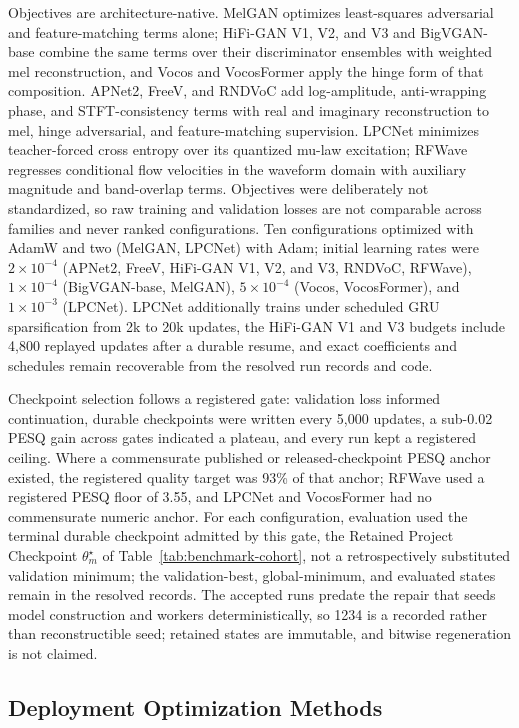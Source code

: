 Objectives are architecture-native.  MelGAN optimizes least-squares
adversarial and feature-matching terms alone; HiFi-GAN V1, V2, and V3 and
BigVGAN-base combine the same terms over their discriminator ensembles
with weighted mel reconstruction, and Vocos and VocosFormer apply the
hinge form of that composition.  APNet2, FreeV, and
RNDVoC add log-amplitude, anti-wrapping phase, and STFT-consistency terms
with real and imaginary reconstruction to mel, hinge adversarial, and
feature-matching supervision.  LPCNet minimizes teacher-forced cross
entropy over its quantized mu-law excitation; RFWave regresses conditional
flow velocities in the waveform domain with auxiliary magnitude and
band-overlap terms.  Objectives were deliberately not standardized, so raw
training and validation losses are not comparable across families and
never ranked configurations.  Ten configurations optimized with AdamW and
two (MelGAN, LPCNet) with Adam; initial learning rates were
$2{\times}10^{-4}$ (APNet2, FreeV, HiFi-GAN V1, V2, and V3, RNDVoC,
RFWave), $1{\times}10^{-4}$ (BigVGAN-base, MelGAN), $5{\times}10^{-4}$
(Vocos, VocosFormer), and $1{\times}10^{-3}$ (LPCNet).  LPCNet additionally
trains under scheduled GRU sparsification from 2k to 20k updates, the
HiFi-GAN V1 and V3 budgets include 4,800 replayed updates after a durable
resume, and exact coefficients and schedules remain recoverable from the
resolved run records and code.

Checkpoint selection follows a registered gate: validation loss informed
continuation, durable checkpoints were written every 5,000 updates, a
sub-0.02 PESQ gain across gates indicated a plateau, and every run kept a
registered ceiling.  Where a commensurate published or released-checkpoint
PESQ anchor existed, the registered quality target was 93\% of that
anchor; RFWave used a registered PESQ floor of 3.55, and LPCNet and
VocosFormer had no commensurate numeric anchor.  For each configuration, evaluation
used the terminal durable checkpoint admitted by this gate, the Retained
Project Checkpoint $\theta_m^\star$ of Table~\ref{tab:benchmark-cohort},
not a retrospectively substituted validation minimum; the
validation-best, global-minimum, and evaluated states remain in the
resolved records.  The accepted runs predate the repair that seeds model
construction and workers deterministically, so 1234 is a recorded rather
than reconstructible seed; retained states are immutable, and bitwise
regeneration is not claimed.

\subsection{Deployment Optimization Methods}
\label{sec:deployment-methods}

